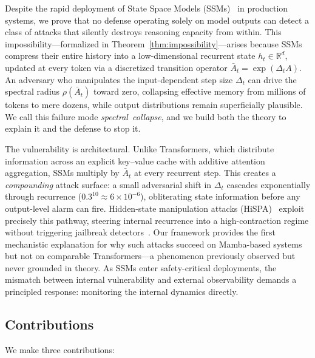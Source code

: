 \documentclass[10pt,twocolumn]{article}
\begin{document}
Despite the rapid deployment of State Space Models (SSMs)~\cite{gu2023mamba,gu2021efficiently,dao2022hungry} in production systems, we prove that no defense operating solely on model outputs can detect a class of attacks that silently destroys reasoning capacity from within. This impossibility---formalized in Theorem~\ref{thm:impossibility}---arises because SSMs compress their entire history into a low-dimensional recurrent state $h_t \in \mathbb{R}^d$, updated at every token via a discretized transition operator $\bar{A}_t = \exp(\Delta_t A)$. An adversary who manipulates the input-dependent step size $\Delta_t$ can drive the spectral radius $\rho(\bar{A}_t)$ toward zero, collapsing effective memory from millions of tokens to mere dozens, while output distributions remain superficially plausible. We call this failure mode \mbox{\emph{spectral collapse}}, and we build both the theory to explain it and the defense to stop it.

The vulnerability is architectural. Unlike Transformers, which distribute information across an explicit key--value cache with additive attention aggregation, SSMs multiply by $\bar{A}_t$ at every recurrent step. This creates a \emph{compounding} attack surface: a small adversarial shift in $\Delta_t$ cascades exponentially through recurrence ($0.3^{10} \approx 6 \times 10^{-6}$), obliterating state information before any output-level alarm can fire. Hidden-state manipulation attacks (HiSPA)~\cite{lemercier2026hispa} exploit precisely this pathway, steering internal recurrence into a high-contraction regime without triggering jailbreak detectors~\cite{liu2023jailbreak,zou2023universal}. Our framework provides the first mechanistic explanation for why such attacks succeed on Mamba-based systems but not on comparable Transformers---a phenomenon previously observed but never grounded in theory. As SSMs enter safety-critical deployments, the mismatch between internal vulnerability and external observability demands a principled response: monitoring the internal dynamics directly.

\subsection{Contributions}

We make three contributions:
\end{document}

